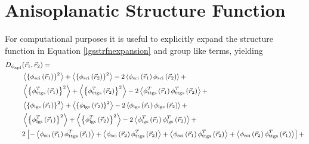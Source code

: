 \section{Anisoplanatic Structure Function}
\label{sec:strfn}


For computational purposes it is useful to explicitly expand the
structure function in Equation \ref{lgsstrfnexpansion} and group like
terms, yielding
\begin{equation}\label{strfn_x}
\small
\begin{aligned}
D_{\phi_{\rm apl}}&(\vec{r}_{1}, \vec{r}_{2}) = 
\\ &
\left\langle\left\{\phi_{\rm sci}\left(\vec{r}_{1}\right)\right\}^{2}\right\rangle +
\left\langle\left\{\phi_{\rm sci}\left(\vec{r}_{2}\right)\right\}^{2}\right\rangle -
2\left\langle\phi_{\rm sci}\left(\vec{r}_{1}\right) \phi_{\rm sci}\left(\vec{r}_{2}\right)\right\rangle + 
\\ & 
\left\langle\left\{\phi^{T}_{\rm ttgs}\left(\vec{r}_{1}\right)\right\}^{2}\right\rangle  + 
\left\langle\left\{\phi^{T}_{\rm ttgs}\left(\vec{r}_{2}\right) \right\}^{2}\right\rangle -
2\left\langle\phi^{T}_{\rm ttgs}\left(\vec{r}_{1}\right) \phi^{T}_{\rm ttgs}\left(\vec{r}_{2}\right)\right\rangle +
\\ & 
\left\langle\left\{ \phi_{\rm lgs}\left(\vec{r}_{1}\right)\right\}^{2}\right\rangle +
\left\langle\left\{ \phi_{\rm lgs}\left(\vec{r}_{2}\right)\right\}^{2}\right\rangle -
2\left\langle\phi_{\rm lgs}\left(\vec{r}_{1}\right) \phi_{\rm lgs}\left(\vec{r}_{2}\right)\right\rangle +
\\ & 
\left\langle\left\{ \phi^{T}_{\rm lgs}\left(\vec{r}_{1}\right)\right\}^{2}\right\rangle  +
\left\langle\left\{ \phi^{T}_{\rm lgs}\left(\vec{r}_{2}\right)\right\}^{2}\right\rangle - 
2\left\langle\phi^{T}_{\rm lgs}\left(\vec{r}_{1}\right) \phi^{T}_{\rm lgs}\left(\vec{r}_{2}\right)\right\rangle +
\\ & 
2\left[-\left\langle\phi_{\rm sci}\left(\vec{r}_{1}\right) \phi^{T}_{\rm ttgs}\left(\vec{r}_{1}\right)\right\rangle + 
\left\langle\phi_{\rm sci}\left(\vec{r}_{2}\right) \phi^{T}_{\rm ttgs}\left(\vec{r}_{2}\right)\right\rangle +
\left\langle\phi_{\rm sci}\left(\vec{r}_{1}\right) \phi^{T}_{\rm ttgs}\left(\vec{r}_{2}\right)\right\rangle +
\left\langle\phi_{\rm sci}\left(\vec{r}_{2}\right) \phi^{T}_{\rm ttgs}\left(\vec{r}_{1}\right)\right\rangle\right] +

\end{aligned}
\end{equation}
